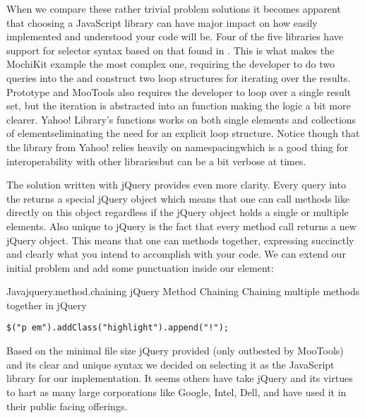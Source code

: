 When we compare these rather trivial problem solutions it becomes apparent
that choosing a JavaScript library can have major impact on how easily
implemented and understood your code will be. Four of the five libraries
have support for selector syntax based on
that found in .%
This is what makes the MochiKit example the most complex one, requiring the
developer to do two queries into the  and construct two
loop structures for iterating over the results.
Prototype and MooTools also requires the developer to loop over a single
result set, but the iteration is abstracted into an  function
making the logic a bit more clearer. Yahoo!  Library's 
functions works on both single elements and collections of
elements\dash{}eliminating the need for an explicit loop structure.
Notice though that the library from
Yahoo! relies heavily on namespacing\dash{}which is a good thing for
interoperability with other libraries\dash{}but can be a bit verbose at times.

The solution written with jQuery provides even more clarity.
Every query into the  returns a special jQuery object which means
that one can call methods like  directly on this object
regardless if the jQuery object holds a single or multiple elements.
Also unique to jQuery is the fact that every method call returns a new jQuery
object. This means that one can  methods together, expressing
succinctly and clearly what you intend to accomplish with your code. We can
extend our initial problem and add some punctuation inside our 
element:

\begin{scode}{Java}{jquery.method.chaining}{%
  jQuery Method Chaining}{%
  Chaining multiple methods together in jQuery}
\begin{lstlisting}
$("p em").addClass("highlight").append("!");
\end{lstlisting}
\end{scode}

Based on the minimal file size jQuery provided (only outbested by MooTools)
and its clear and unique syntax we decided on selecting it as the JavaScript
library for our implementation. It seems others have take jQuery and its
virtues to hart as many large corporations like Google, Intel, Dell, and
 have used it in their public facing offerings.%

